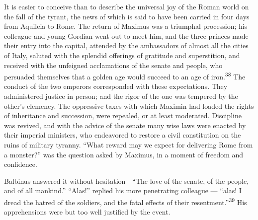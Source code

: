 
It is easier to conceive than to describe the universal joy of
the Roman world on the fall of the tyrant, the news of which is
said to have been carried in four days from Aquileia to Rome. The
return of Maximus was a triumphal procession; his colleague and
young Gordian went out to meet him, and the three princes made
their entry into the capital, attended by the ambassadors of
almost all the cities of Italy, saluted with the splendid
offerings of gratitude and superstition, and received with the
unfeigned acclamations of the senate and people, who persuaded
themselves that a golden age would succeed to an age of iron.\textsuperscript{38}
The conduct of the two emperors corresponded with these
expectations. They administered justice in person; and the rigor
of the one was tempered by the other’s clemency. The oppressive
taxes with which Maximin had loaded the rights of inheritance and
succession, were repealed, or at least moderated. Discipline was
revived, and with the advice of the senate many wise laws were
enacted by their imperial ministers, who endeavored to restore a
civil constitution on the ruins of military tyranny. “What reward
may we expect for delivering Rome from a monster?” was the
question asked by Maximus, in a moment of freedom and confidence.

Balbinus answered it without hesitation—“The love of the senate,
of the people, and of all mankind.” “Alas!” replied his more
penetrating colleague — “alas! I dread the hatred of the soldiers,
and the fatal effects of their resentment.”\textsuperscript{39} His apprehensions
were but too well justified by the event.



